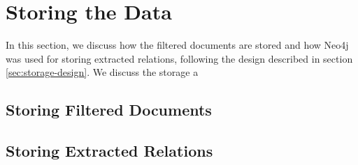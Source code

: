 \section{Storing the Data}
In this section, we discuss how the filtered documents are stored and how Neo4j was used for storing extracted relations, following the design described in section \ref{sec:storage-design}. We discuss the storage a
\subsection{Storing Filtered Documents}
\subsection{Storing Extracted Relations}
